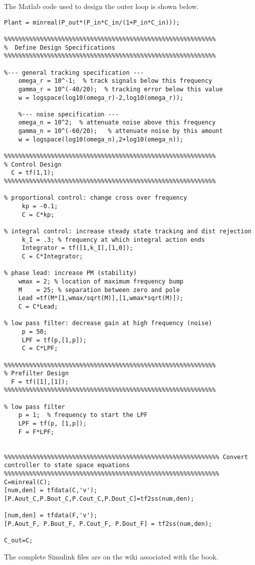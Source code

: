 The Matlab code used to design the outer loop is shown below.
\begin{lstlisting}
Plant = minreal(P_out*(P_in*C_in/(1+P_in*C_in)));

%%%%%%%%%%%%%%%%%%%%%%%%%%%%%%%%%%%%%%%%%%%%%%%%%%%%%%%%%%%
%  Define Design Specifications
%%%%%%%%%%%%%%%%%%%%%%%%%%%%%%%%%%%%%%%%%%%%%%%%%%%%%%%%%%%

%--- general tracking specification ---
    omega_r = 10^-1;  % track signals below this frequency
    gamma_r = 10^(-40/20);  % tracking error below this value
    w = logspace(log10(omega_r)-2,log10(omega_r));

    %--- noise specification ---
    omega_n = 10^2;  % attenuate noise above this frequency
    gamma_n = 10^(-60/20);   % attenuate noise by this amount
    w = logspace(log10(omega_n),2+log10(omega_n));

%%%%%%%%%%%%%%%%%%%%%%%%%%%%%%%%%%%%%%%%%%%%%%%%%%%%%%%%%%%
% Control Design
  C = tf(1,1);
%%%%%%%%%%%%%%%%%%%%%%%%%%%%%%%%%%%%%%%%%%%%%%%%%%%%%%%%%%%

% proportional control: change cross over frequency
     kp = -0.1;
     C = C*kp;

% integral control: increase steady state tracking and dist rejection
     k_I = .3; % frequency at which integral action ends
     Integrator = tf([1,k_I],[1,0]);
     C = C*Integrator;

% phase lead: increase PM (stability)
    wmax = 2; % location of maximum frequency bump
    M    = 25; % separation between zero and pole
    Lead =tf(M*[1,wmax/sqrt(M)],[1,wmax*sqrt(M)]);
    C = C*Lead;

% low pass filter: decrease gain at high frequency (noise)
     p = 50;
     LPF = tf(p,[1,p]);
     C = C*LPF;

%%%%%%%%%%%%%%%%%%%%%%%%%%%%%%%%%%%%%%%%%%%%%%%%%%%%%%%%%%%
% Prefilter Design
  F = tf([1],[1]);
%%%%%%%%%%%%%%%%%%%%%%%%%%%%%%%%%%%%%%%%%%%%%%%%%%%%%%%%%%%

% low pass filter
    p = 1;  % frequency to start the LPF
    LPF = tf(p, [1,p]);
    F = F*LPF;

        
%%%%%%%%%%%%%%%%%%%%%%%%%%%%%%%%%%%%%%%%%%%%%%%%%%%%%%%%%%%% Convert controller to state space equations 
%%%%%%%%%%%%%%%%%%%%%%%%%%%%%%%%%%%%%%%%%%%%%%%%%%%%%%%%%%%%
C=minreal(C);
[num,den] = tfdata(C,'v');
[P.Aout_C,P.Bout_C,P.Cout_C,P.Dout_C]=tf2ss(num,den);

[num,den] = tfdata(F,'v');
[P.Aout_F, P.Bout_F, P.Cout_F, P.Dout_F] = tf2ss(num,den);

C_out=C;
\end{lstlisting}

The complete Simulink files are on the wiki associated with the book.



